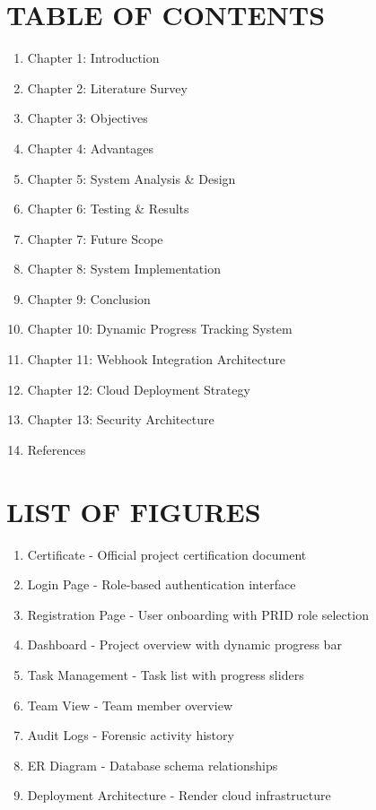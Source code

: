 ﻿\documentclass[12pt]{article}
\def\normaltext{\fontsize{12pt}{18pt}\color{secondary}}
\begin{document}
\section*{{\color{primary}TABLE OF CONTENTS}}
\normaltext
\begin{enumerate}[label={\color{secondary}\arabic*.}]
\item Chapter 1: Introduction
\item Chapter 2: Literature Survey
\item Chapter 3: Objectives
\item Chapter 4: Advantages
\item Chapter 5: System Analysis \& Design
\item Chapter 6: Testing \& Results
\item Chapter 7: Future Scope
\item Chapter 8: System Implementation
\item Chapter 9: Conclusion
\item Chapter 10: Dynamic Progress Tracking System
\item Chapter 11: Webhook Integration Architecture
\item Chapter 12: Cloud Deployment Strategy
\item Chapter 13: Security Architecture
\item References
\end{enumerate}
\newpage

\section*{{\color{primary}LIST OF FIGURES}}
\normaltext
\begin{enumerate}[label={\color{secondary}Figure \arabic*:}]
\item Certificate - Official project certification document
\item Login Page - Role-based authentication interface
\item Registration Page - User onboarding with PRID role selection
\item Dashboard - Project overview with dynamic progress bar
\item Task Management - Task list with progress sliders
\item Team View - Team member overview
\item Audit Logs - Forensic activity history
\item ER Diagram - Database schema relationships
\item Deployment Architecture - Render cloud infrastructure
\end{enumerate}
\newpage
\end{document}
